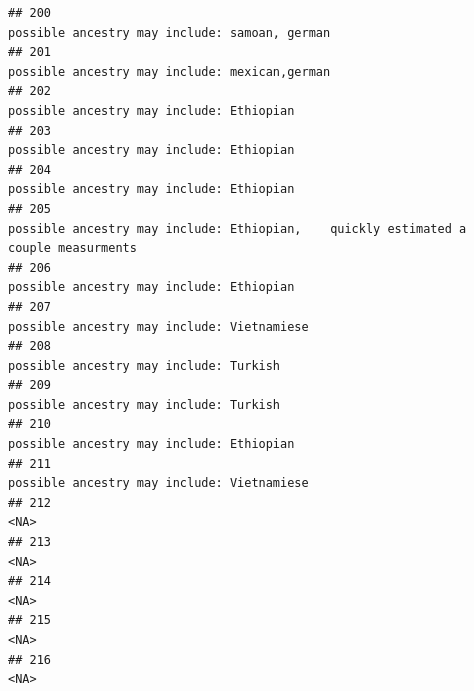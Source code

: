 \documentclass[]{article}
\begin{document}
\begin{verbatim}
## 200                                                                                                       possible ancestry may include: samoan, german
## 201                                                                                                       possible ancestry may include: mexican,german
## 202                                                                                                            possible ancestry may include: Ethiopian
## 203                                                                                                            possible ancestry may include: Ethiopian
## 204                                                                                                            possible ancestry may include: Ethiopian
## 205                                                                 possible ancestry may include: Ethiopian,    quickly estimated a couple measurments
## 206                                                                                                            possible ancestry may include: Ethiopian
## 207                                                                                                          possible ancestry may include: Vietnamiese
## 208                                                                                                              possible ancestry may include: Turkish
## 209                                                                                                              possible ancestry may include: Turkish
## 210                                                                                                            possible ancestry may include: Ethiopian
## 211                                                                                                          possible ancestry may include: Vietnamiese
## 212                                                                                                                                                <NA>
## 213                                                                                                                                                <NA>
## 214                                                                                                                                                <NA>
## 215                                                                                                                                                <NA>
## 216                                                                                                                                                <NA>

\end{verbatim}
\end{document}

